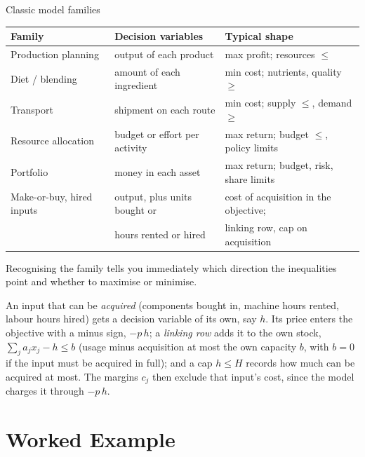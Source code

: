 \begin{rulebox}{Classic model families}
\begin{center}\small
\begin{tabular}{|l|l|l|}
\hline
\textbf{Family} & \textbf{Decision variables} & \textbf{Typical shape}\\
\hline
Production planning & output of each product & max profit; resources $\le$\\
Diet / blending & amount of each ingredient & min cost; nutrients,
  quality $\ge$\\
Transport & shipment on each route & min cost; supply $\le$,
  demand $\ge$\\
Resource allocation & budget or effort per activity & max return;
  budget $\le$, policy limits\\
Portfolio & money in each asset & max return; budget, risk,
  share limits\\
Make-or-buy, hired inputs & output, plus units bought or & cost of
  acquisition in the objective;\\
 & hours rented or hired & linking row, cap on acquisition\\
\hline
\end{tabular}
\end{center}
Recognising the family tells you immediately which direction the
inequalities point and whether to maximise or minimise.

An input that can be \emph{acquired} (components bought in, machine hours
rented, labour hours hired) gets a decision variable of its own, say $h$.
Its price enters the objective with a minus sign, $-p\,h$; a
\emph{linking row} adds it to the own stock,
$\sum_j a_{j}x_{j}-h\le b$ (usage minus acquisition at most the own
capacity $b$, with $b=0$ if the input must be acquired in full); and a cap
$h\le H$ records how much can be acquired at most. The margins $c_j$ then
exclude that input's cost, since the model charges it through $-p\,h$.
\end{rulebox}

\section{Worked Example}

